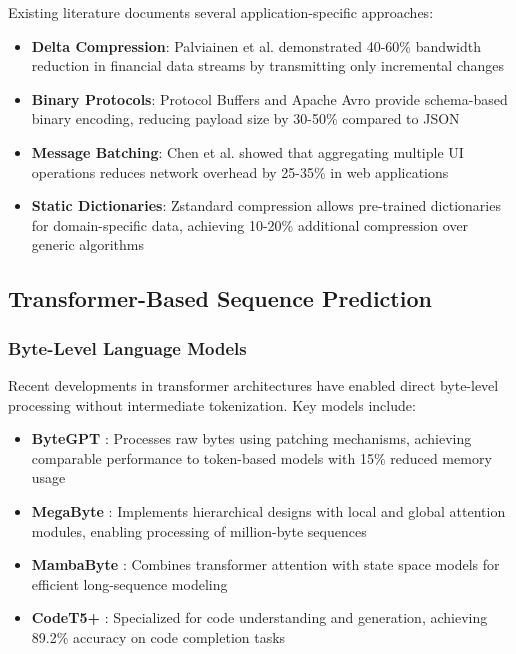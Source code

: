 \documentclass[12pt,a4paper]{article}
\begin{document}
Existing literature documents several application-specific approaches:

\begin{itemize}
    \item \textbf{Delta Compression}: Palviainen et al. \cite{palviainen2018} demonstrated 40-60\% bandwidth reduction in financial data streams by transmitting only incremental changes
    \item \textbf{Binary Protocols}: Protocol Buffers \cite{protobuf} and Apache Avro \cite{avro} provide schema-based binary encoding, reducing payload size by 30-50\% compared to JSON
    \item \textbf{Message Batching}: Chen et al. \cite{chen2019} showed that aggregating multiple UI operations reduces network overhead by 25-35\% in web applications
    \item \textbf{Static Dictionaries}: Zstandard compression \cite{zstandard} allows pre-trained dictionaries for domain-specific data, achieving 10-20\% additional compression over generic algorithms
\end{itemize}

\subsection{Transformer-Based Sequence Prediction}

\subsubsection{Byte-Level Language Models}

Recent developments in transformer architectures have enabled direct byte-level processing without intermediate tokenization. Key models include:

\begin{itemize}
    \item \textbf{ByteGPT} \cite{bytegpt}: Processes raw bytes using patching mechanisms, achieving comparable performance to token-based models with 15\% reduced memory usage
    \item \textbf{MegaByte} \cite{megabyte}: Implements hierarchical designs with local and global attention modules, enabling processing of million-byte sequences
    \item \textbf{MambaByte} \cite{mambabyte}: Combines transformer attention with state space models for efficient long-sequence modeling
    \item \textbf{CodeT5+} \cite{codet5plus}: Specialized for code understanding and generation, achieving 89.2\% accuracy on code completion tasks
\end{itemize}
\end{document}
